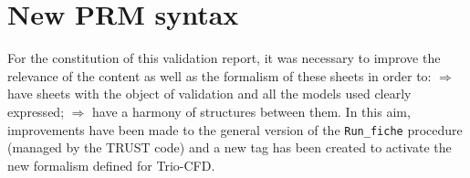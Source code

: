 \section{\label{sec:New-PRM-syntax}New \textsf{PRM} syntax}
For the constitution of this validation report, it was necessary to improve the relevance of the content as well as the formalism of these sheets in order to:\vspace*{0.2cm}\newline
\hspace*{0.5cm}$\Rightarrow$ have sheets with the object of validation and all the models used clearly expressed;\vspace*{0.15cm}\newline
\hspace*{0.5cm}$\Rightarrow$ have a harmony of structures between them.\vspace*{0.4cm}\newline
In this aim, improvements have been made to the general version of the \verb"Run_fiche" procedure (managed by the TRUST code) and a new tag has been created to activate the new formalism defined for Trio-CFD.\newline

